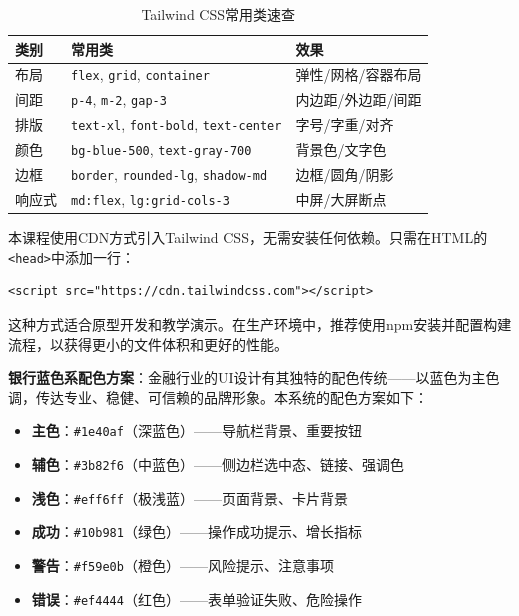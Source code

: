 \begin{table}[H]
\centering
\small
\begin{tabular}{lll}
\toprule
\textbf{类别} & \textbf{常用类} & \textbf{效果} \\
\midrule
布局 & \texttt{flex}, \texttt{grid}, \texttt{container} & 弹性/网格/容器布局 \\
间距 & \texttt{p-4}, \texttt{m-2}, \texttt{gap-3} & 内边距/外边距/间距 \\
排版 & \texttt{text-xl}, \texttt{font-bold}, \texttt{text-center} & 字号/字重/对齐 \\
颜色 & \texttt{bg-blue-500}, \texttt{text-gray-700} & 背景色/文字色 \\
边框 & \texttt{border}, \texttt{rounded-lg}, \texttt{shadow-md} & 边框/圆角/阴影 \\
响应式 & \texttt{md:flex}, \texttt{lg:grid-cols-3} & 中屏/大屏断点 \\
\bottomrule
\end{tabular}
\caption{Tailwind CSS常用类速查}
\end{table}

\begin{notebox}
本课程使用CDN方式引入Tailwind CSS，无需安装任何依赖。只需在HTML的\texttt{<head>}中添加一行：

\begin{lstlisting}[style=html]
<script src="https://cdn.tailwindcss.com"></script>
\end{lstlisting}

这种方式适合原型开发和教学演示。在生产环境中，推荐使用npm安装并配置构建流程，以获得更小的文件体积和更好的性能。
\end{notebox}

\textbf{银行蓝色系配色方案}：金融行业的UI设计有其独特的配色传统——以蓝色为主色调，传达专业、稳健、可信赖的品牌形象。本系统的配色方案如下：
\begin{itemize}[leftmargin=2em]
  \item \textbf{主色}：\texttt{\#1e40af}（深蓝色）——导航栏背景、重要按钮
  \item \textbf{辅色}：\texttt{\#3b82f6}（中蓝色）——侧边栏选中态、链接、强调色
  \item \textbf{浅色}：\texttt{\#eff6ff}（极浅蓝）——页面背景、卡片背景
  \item \textbf{成功}：\texttt{\#10b981}（绿色）——操作成功提示、增长指标
  \item \textbf{警告}：\texttt{\#f59e0b}（橙色）——风险提示、注意事项
  \item \textbf{错误}：\texttt{\#ef4444}（红色）——表单验证失败、危险操作
\end{itemize}

